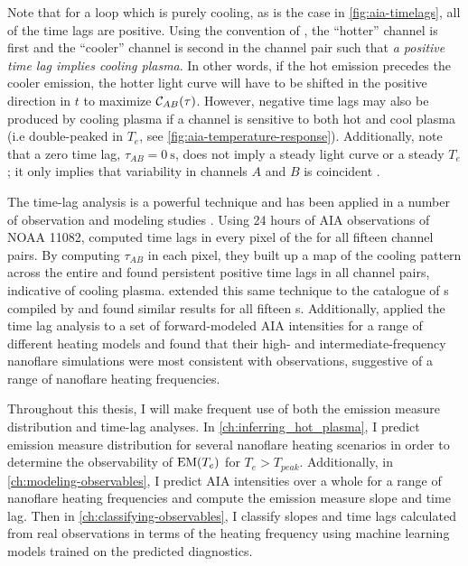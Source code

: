 Note that for a loop which is purely cooling, as is the case in \autoref{fig:aia-timelags}, all of the time lags are positive. Using the convention of \citet{viall_evidence_2012}, the ``hotter'' channel is first and the ``cooler'' channel is second in the channel pair such that \textit{a positive time lag implies cooling plasma}. In other words, if the hot emission precedes the cooler emission, the hotter light curve will have to be shifted in the positive direction in $t$ to maximize $\mathcal{C}_{AB}(\tau)$. However, negative time lags may also be produced by cooling plasma if a channel is sensitive to both hot and cool plasma (i.e double-peaked in $T_e$, see \autoref{fig:aia-temperature-response}). Additionally, note that a zero time lag, $\tau_{AB}=\SI{0}{\second}$, does not imply a steady light curve or a steady $T_e$; it only implies that variability in channels $A$ and $B$ is coincident \citep{viall_transition_2015,viall_signatures_2016}.

The time-lag analysis is a powerful technique and has been applied in a number of observation and modeling studies \citep[e.g.][]{winebarger_investigation_2016,winebarger_identifying_2018,lionello_can_2016,froment_long-period_2017}. Using 24 hours of AIA observations of \AR{} NOAA 11082, \citet{viall_evidence_2012} computed time lags in every pixel of the \AR{} for all fifteen channel pairs. By computing $\tau_{AB}$ in each pixel, they built up a map of the cooling pattern across the entire \AR{} and found persistent positive time lags in all channel pairs, indicative of cooling plasma. \citet{viall_survey_2017} extended this same technique to the catalogue of \AR s compiled by \citet{warren_systematic_2012} and found similar results for all fifteen \AR s. Additionally, \citet{bradshaw_patterns_2016} applied the time lag analysis to a set of forward-modeled AIA intensities for a range of different heating models and found that their high- and intermediate-frequency nanoflare simulations were most consistent with observations, suggestive of a range of nanoflare heating frequencies.

Throughout this thesis, I will make frequent use of both the emission measure distribution and time-lag analyses. In \autoref{ch:inferring_hot_plasma}, I predict emission measure distribution for several nanoflare heating scenarios in order to determine the observability of $\textup{EM}(T_e)$ for $T_e>T_{peak}$. Additionally, in \autoref{ch:modeling-observables}, I predict AIA intensities over a whole \AR{} for a range of nanoflare heating frequencies and compute the emission measure slope and time lag. Then in \autoref{ch:classifying-observables}, I classify slopes and time lags calculated from real observations in terms of the heating frequency using machine learning models trained on the predicted diagnostics.

